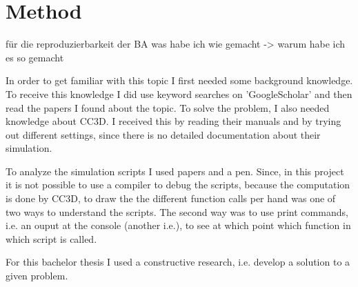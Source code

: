 \chapter{Method}
    
für die reproduzierbarkeit der BA \newline
was habe ich wie gemacht -> warum habe ich es so gemacht

In order to get familiar with this topic I first needed some background knowledge. To receive this knowledge I did use keyword searches on 'GoogleScholar' and then read the papers I found about the topic. To solve the problem, I also needed knowledge about \ac{CC3D}. I received this by reading their manuals and by trying out different settings, since there is no detailed documentation about their simulation.

To analyze the simulation scripts I used papers and a pen. Since, in this project it is not possible to use a compiler to debug the scripts, because the computation is done by \ac{CC3D}, to draw the the different function calls per hand was one of two ways to understand the scripts. The second way was to use print commands, i.e. an ouput at the console (another i.e.), to see at which point which function in which script is called. 


For this bachelor thesis I used a constructive research, i.e. develop a solution to a given problem.

